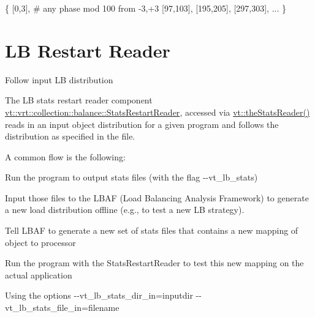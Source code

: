 \begin{DoxyCode}
\{
  [0,3], # any phase mod 100 from -3,+3
  [97,103],
  [195,205],
  [297,303], ...
\}
\end{DoxyCode}
 \hypertarget{stats-reader}{}\section{LB Restart Reader}\label{stats-reader}
Follow input LB distribution

The LB stats restart reader component {\ttfamily \hyperlink{structvt_1_1vrt_1_1collection_1_1balance_1_1_stats_restart_reader}{vt\+::vrt\+::collection\+::balance\+::\+Stats\+Restart\+Reader}}, accessed via {\ttfamily \hyperlink{namespacevt_ad73860100c7d2ca1d833eab74942ee73}{vt\+::the\+Stats\+Reader()}} reads in an input object distribution for a given program and follows the distribution as specified in the file.

A common flow is the following\+:
\begin{DoxyItemize}
\item Run the program to output stats files (with the flag {\ttfamily -\/-\/vt\+\_\+lb\+\_\+stats})
\item Input those files to the L\+B\+AF (Load Balancing Analysis Framework) to generate a new load distribution offline (e.\+g., to test a new LB strategy).
\begin{DoxyItemize}
\item Tell L\+B\+AF to generate a new set of stats files that contains a new mapping of object to processor
\end{DoxyItemize}
\item Run the program with the {\ttfamily Stats\+Restart\+Reader} to test this new mapping on the actual application
\begin{DoxyItemize}
\item Using the options {\ttfamily -\/-\/vt\+\_\+lb\+\_\+stats\+\_\+dir\+\_\+in=inputdir -\/-\/vt\+\_\+lb\+\_\+stats\+\_\+file\+\_\+in=filename} 
\end{DoxyItemize}
\end{DoxyItemize}